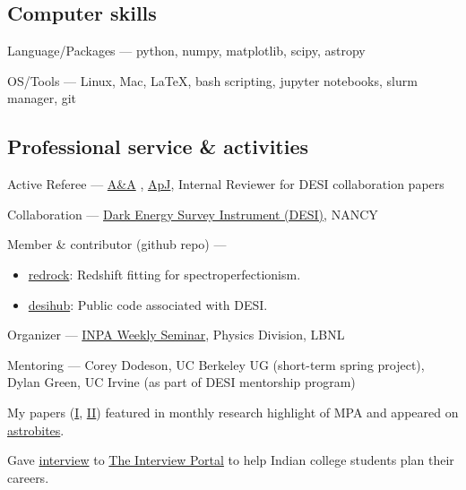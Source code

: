\documentclass[12pt,letterpaper]{article}
\begin{document}
\subsection{Computer skills}
\begin{list}{}{\cvlist}
\item Language/Packages ---  
    python, numpy, matplotlib, scipy, astropy
\item OS/Tools --- Linux, Mac, \LaTeX, bash scripting, jupyter notebooks, slurm manager, git
\end{list}

\subsection{Professional service \& activities}
\begin{list}{}{\cvlist}
    \item Active Referee ---
    \href{https://en.wikipedia.org/wiki/Astronomy_%26_Astrophysics}{A\&A}
    , \href{https://en.wikipedia.org/wiki/The_Astrophysical_Journal}{ApJ}, Internal Reviewer for DESI collaboration papers
    \item Collaboration ---
        \href{https://www.desi.lbl.gov/}{Dark Energy Survey Instrument (DESI)}, NANCY
    \item Member \& contributor (github repo) ---
    \begin{itemize}
      \item[] \href{https://github.com/desihub/redrock}{redrock}: Redshift fitting for spectroperfectionism.
      \item[] \href{https://github.com/desihub}{desihub}: Public code associated with DESI.
    \end{itemize}
    \item Organizer ---
        \href{https://inpa.lbl.gov/events/}{INPA Weekly Seminar}, Physics Division, LBNL
    \item Mentoring ---
        Corey Dodeson, UC Berkeley UG (short-term spring project), Dylan Green, UC Irvine (as part of DESI mentorship program)
    \item My papers (\href{https://www.mpa-garching.mpg.de/964620/hl202107}{I}, \href{https://www.mpa-garching.mpg.de/1066558/hl202211?c=27981}{II}) featured in monthly research highlight of MPA and appeared on \href{https://astrobites.org/2021/05/06/cool-metal-gas-search-thanks-it-was-automated/}{astrobites}.
    \item Gave \href{https://theinterviewportal.com/2020/03/13/astrophysicist-interview-8/}{interview} to \href{https://theinterviewportal.com/}{The Interview Portal} to help Indian college students plan their careers. 

\end{list}
\end{document}
